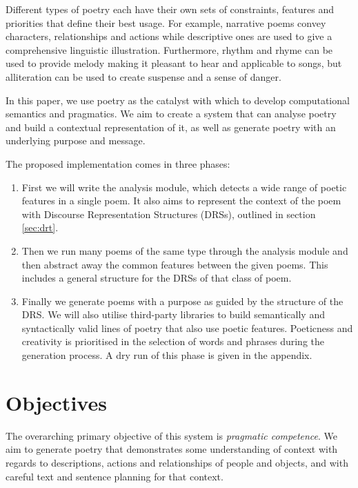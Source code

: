 Different types of poetry each have their own sets of constraints, features and priorities that define their best usage. For example, narrative poems convey characters, relationships and actions while descriptive ones are used to give a comprehensive linguistic illustration. Furthermore, rhythm and rhyme can be used to provide melody making it pleasant to hear and applicable to songs, but alliteration can be used to create suspense and a sense of danger.

In this paper, we use poetry as the catalyst with which to develop computational semantics and pragmatics. We aim to create a system that can analyse poetry and build a contextual representation of it, as well as generate poetry with an underlying purpose and message.

The proposed implementation comes in three phases:
\begin{enumerate}
\item{First we will write the analysis module, which detects a wide range of poetic features in a single poem. It also aims to represent the context of the poem with Discourse Representation Structures (DRSs), outlined in section \ref{sec:drt}.}

\item{Then we run many poems of the same type through the analysis module and then abstract away the common features between the given poems. This includes a general structure for the DRSs of that class of poem.}

\item{Finally we generate poems with a purpose as guided by the structure of the DRS. We will also utilise third-party libraries to build semantically and syntactically valid lines of poetry that also use poetic features. Poeticness and creativity is prioritised in the selection of words and phrases during the generation process. A dry run of this phase is given in the appendix.}
\end{enumerate}




\section{Objectives}
The overarching primary objective of this system is \textit{pragmatic competence}. We aim to generate poetry that demonstrates some understanding of context with regards to descriptions, actions and relationships of people and objects, and with careful text and sentence planning for that context.

